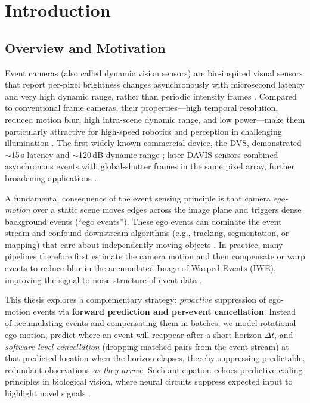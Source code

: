 \chapter{Introduction}

\section{Overview and Motivation}

Event cameras (also called dynamic vision sensors) are bio-inspired visual sensors that report per-pixel brightness changes asynchronously with microsecond latency and very high dynamic range, rather than periodic intensity frames \cite{Gallego2020Survey}. Compared to conventional frame cameras, their properties—high temporal resolution, reduced motion blur, high intra-scene dynamic range, and low power—make them particularly attractive for high-speed robotics and perception in challenging illumination \cite{Gallego2020Survey,Lichtsteiner2008DVS,Brandli2014DAVIS}. The first widely known commercial device, the DVS, demonstrated $\sim$15\,\textmu s latency and $\sim$120\,dB dynamic range \cite{Lichtsteiner2008DVS}; later DAVIS sensors combined asynchronous events with global-shutter frames in the same pixel array, further broadening applications \cite{Brandli2014DAVIS}. 

A fundamental consequence of the event sensing principle is that camera \emph{ego-motion} over a static scene moves edges across the image plane and triggers dense background events (``ego events''). These ego events can dominate the event stream and confound downstream algorithms (e.g., tracking, segmentation, or mapping) that care about independently moving objects \cite{Stoffregen2019Segmentation,Gallego2020Survey}. In practice, many pipelines therefore first estimate the camera motion and then compensate or warp events to reduce blur in the accumulated Image of Warped Events (IWE), improving the signal-to-noise structure of event data \cite{Gallego2018CMax,Bardow2016SOFIE}. 

This thesis explores a complementary strategy: \emph{proactive} suppression of ego-motion events via \textbf{forward prediction and per-event cancellation}. Instead of accumulating events and compensating them in batches, we model rotational ego-motion, predict where an event will reappear after a short horizon $\Delta t$, and \emph{software-level cancellation} (dropping matched pairs from the event stream) at that predicted location when the horizon elapses, thereby suppressing predictable, redundant observations \emph{as they arrive}. Such anticipation echoes predictive-coding principles in biological vision, where neural circuits suppress expected input to highlight novel signals \cite{Hosoya2005RetinaPC,Rao1999V1PC}. 


